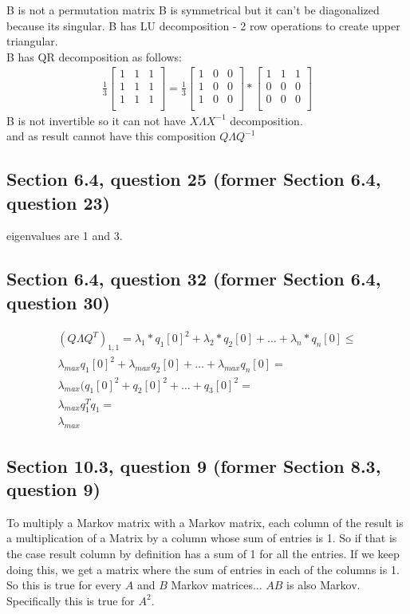 \documentclass[a4paper,11pt]{article}
\begin{document}
B is not a permutation matrix
B is symmetrical but it can't be diagonalized because its singular.
B has LU decomposition - 2 row operations to create upper triangular.\\
B has QR decomposition as follows:
\begin{align*}
\frac{1}{3}
\begin{bmatrix}
1 & 1 & 1 \\
1 & 1 & 1 \\
1 & 1 & 1 \\
\end{bmatrix} = 
\frac{1}{3}
\begin{bmatrix}
1 & 0 & 0 \\
1 & 0 & 0 \\
1 & 0 & 0 \\
\end{bmatrix} *
\begin{bmatrix}
1 & 1 & 1 \\
0 & 0 & 0 \\
0 & 0 & 0 \\
\end{bmatrix}
\end{align*}
B is not invertible so it can not have $X\Lambda{X^{-1}}$ decomposition.\\
and as result cannot have this composition $Q\Lambda{Q^{-1}}$
\subsection*{Section 6.4, question 25 (former Section 6.4, question 23)}
eigenvalues are 1 and 3.
\subsection*{Section 6.4, question 32 (former Section 6.4, question 30)}
\begin{align*}
(Q{\Lambda}Q^T)_{1,1} = \lambda_1*q_1[0]^2+\lambda_2*q_2[0]+\dots+\lambda_n*q_n[0] \leq \\
{\lambda}_{max}q_1[0]^2+{\lambda}_{max}q_2[0]+\dots+{\lambda}_{max}q_n[0] = \\
{\lambda}_{max}(q_1[0]^2+q_2[0]^2+\dots+q_3[0]^2 = \\
{\lambda}_{max}q_1^T{q_1} = \\
{\lambda}_{max}
\end{align*}
\subsection*{Section 10.3, question 9 (former Section 8.3, question 9)}
To multiply a Markov matrix with a Markov matrix, each column of the result is a multiplication of a Matrix by a column whose sum of entries is 1. So if that is the case result column by definition has a sum of 1 for all the entries. If we keep doing this, we get a matrix where the sum of entries in each of the columns is 1. So this is true for every $A$ and $B$ Markov matrices... $AB$ is also Markov. Specifically this is true for $A^2$.
\end{document}

